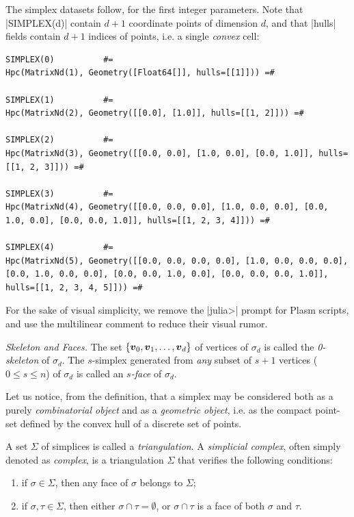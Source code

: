 \begin{coding} The simplex datasets follow, for the first integer parameters. Note that |SIMPLEX(d)| contain $d+1$ coordinate points of dimension $d$, and that |hulls| fields contain $d+1$ indices of points, i.e. a single \emph{convex} cell:
\begin{lstlisting}[language=JuliaLocal, style=julia, mathescape = true]
SIMPLEX(0)			#=
Hpc(MatrixNd(1), Geometry([Float64[]], hulls=[[1]])) =#

SIMPLEX(1)			#=
Hpc(MatrixNd(2), Geometry([[0.0], [1.0]], hulls=[[1, 2]])) =#

SIMPLEX(2)			#=
Hpc(MatrixNd(3), Geometry([[0.0, 0.0], [1.0, 0.0], [0.0, 1.0]], hulls=[[1, 2, 3]])) =#

SIMPLEX(3)			#=
Hpc(MatrixNd(4), Geometry([[0.0, 0.0, 0.0], [1.0, 0.0, 0.0], [0.0, 1.0, 0.0], [0.0, 0.0, 1.0]], hulls=[[1, 2, 3, 4]])) =#

SIMPLEX(4)			#=
Hpc(MatrixNd(5), Geometry([[0.0, 0.0, 0.0, 0.0], [1.0, 0.0, 0.0, 0.0], [0.0, 1.0, 0.0, 0.0], [0.0, 0.0, 1.0, 0.0], [0.0, 0.0, 0.0, 1.0]], hulls=[[1, 2, 3, 4, 5]])) =#
\end{lstlisting}
\end{coding}

For the sake of visual simplicity, we remove the |julia>| prompt for Plasm scripts, and use the multilinear comment to reduce their visual rumor.


\begin{definition}\emph{Skeleton and Faces.}
The set $\{ {\mbox{\boldmath $v$}}_0, {\mbox{\boldmath $v$}}_1, \ldots, {\mbox{\boldmath $v$}}_d \}$ of vertices of
$\sigma_{d}$ is called the {\em 0-skeleton} of $\sigma_{d}$.  The
$s$-simplex generated from {\em any} subset of $s+1$ vertices ($0\leq
s\leq n$) of $\sigma_{d}$ is called an {\em $s$-face} of $\sigma_{d}$.
\end{definition}
\begin{remark}
Let us notice, from the definition, that a simplex may be considered
both as a purely \emph{combinatorial object} and as a \emph{geometric object}, i.e.
as the compact point-set defined by the convex hull of a discrete set
of points.
\end{remark}


\begin{definition}
A set $\Sigma$ of simplices is called a {\em triangulation}.  
A {\em simplicial complex}, often simply denoted as \emph{complex}, is
a triangulation $\Sigma$ that verifies the following conditions:
\begin{enumerate}
\item
if $\sigma \in \Sigma$, then any face of $\sigma$ belongs to $\Sigma$;

\item
if $\sigma,\tau\in \Sigma$, then either $\sigma\cap
\tau=\emptyset$, or $\sigma\cap\tau$ is a face of both $\sigma$ and
$\tau$.
\end{enumerate}
\end{definition}

